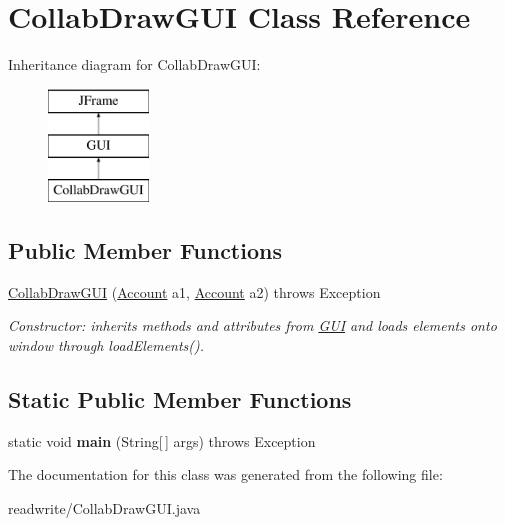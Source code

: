 \hypertarget{class_collab_draw_g_u_i}{}\section{Collab\+Draw\+G\+UI Class Reference}
\label{class_collab_draw_g_u_i}
Inheritance diagram for Collab\+Draw\+G\+UI\+:\begin{figure}[H]
\begin{center}
\leavevmode
\includegraphics[height=3.000000cm]{class_collab_draw_g_u_i}
\end{center}
\end{figure}
\subsection*{Public Member Functions}
\begin{DoxyCompactItemize}
\item 
\mbox{\label{class_collab_draw_g_u_i_ac8f9c49ca65d4c8a85406c4c0e2f638a}} 
\hyperlink{class_collab_draw_g_u_i_ac8f9c49ca65d4c8a85406c4c0e2f638a}{Collab\+Draw\+G\+UI} (\hyperlink{class_account}{Account} a1, \hyperlink{class_account}{Account} a2)  throws Exception 
\begin{DoxyCompactList}\small\item\em Constructor\+: inherits methods and attributes from \hyperlink{class_g_u_i}{G\+UI} and loads elements onto window through load\+Elements(). \end{DoxyCompactList}\end{DoxyCompactItemize}
\subsection*{Static Public Member Functions}
\begin{DoxyCompactItemize}
\item 
\mbox{\label{class_collab_draw_g_u_i_a0339e463a885aed96a0fb5d976d6fef3}} 
static void {\bfseries main} (String\mbox{[}$\,$\mbox{]} args)  throws Exception 
\end{DoxyCompactItemize}


The documentation for this class was generated from the following file\+:\begin{DoxyCompactItemize}
\item 
readwrite/Collab\+Draw\+G\+U\+I.\+java\end{DoxyCompactItemize}
